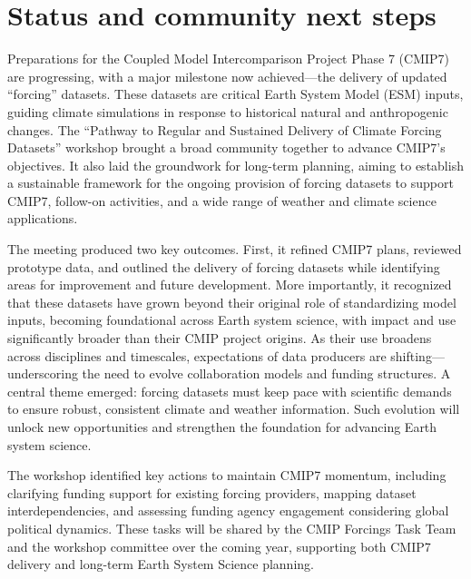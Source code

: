 \documentclass{ametsocV6.1}
\begin{document}
\section*{Status and community next steps}
Preparations for the Coupled Model Intercomparison Project Phase 7 (CMIP7) are progressing, with a major milestone now achieved—the delivery of updated ``forcing'' datasets. These datasets are critical Earth System Model (ESM) inputs, guiding climate simulations in response to historical natural and anthropogenic changes. The ``Pathway to Regular and Sustained Delivery of Climate Forcing Datasets'' workshop brought a broad community together to advance CMIP7’s objectives. It also laid the groundwork for long-term planning, aiming to establish a sustainable framework for the ongoing provision of forcing datasets to support CMIP7, follow-on activities, and a wide range of weather and climate science applications.

The meeting produced two key outcomes. First, it refined CMIP7 plans, reviewed prototype data, and outlined the delivery of forcing datasets while identifying areas for improvement and future development. More importantly, it recognized that these datasets have grown beyond their original role of standardizing model inputs, becoming foundational across Earth system science, with impact and use significantly broader than their CMIP project origins. As their use broadens across disciplines and timescales, expectations of data producers are shifting—underscoring the need to evolve collaboration models and funding structures. A central theme emerged: forcing datasets must keep pace with scientific demands to ensure robust, consistent climate and weather information. Such evolution will unlock new opportunities and strengthen the foundation for advancing Earth system science.

The workshop identified key actions to maintain CMIP7 momentum, including clarifying funding support for existing forcing providers, mapping dataset interdependencies, and assessing funding agency engagement considering global political dynamics. These tasks will be shared by the CMIP Forcings Task Team and the workshop committee over the coming year, supporting both CMIP7 delivery and long-term Earth System Science planning.
\end{document}
